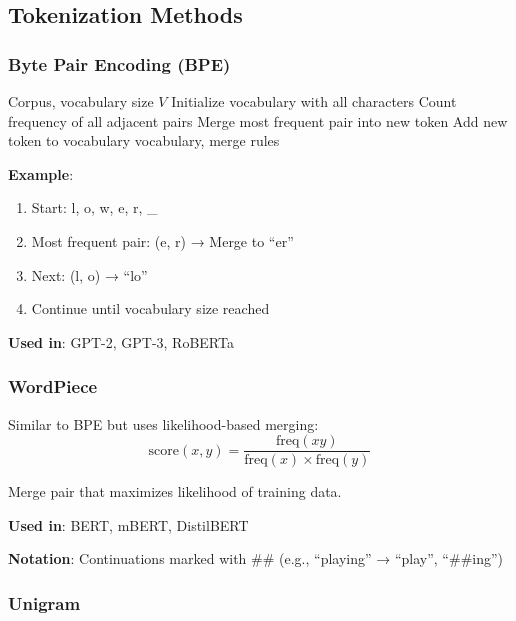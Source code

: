 \subsection{Tokenization Methods}

\subsubsection{Byte Pair Encoding (BPE)}

\begin{algorithm}[H]
\caption{BPE Training}
\begin{algorithmic}[1]
\REQUIRE Corpus, vocabulary size $V$
\STATE Initialize vocabulary with all characters
    \STATE Count frequency of all adjacent pairs
    \STATE Merge most frequent pair into new token
    \STATE Add new token to vocabulary
\ENDWHILE
\RETURN vocabulary, merge rules
\end{algorithmic}
\end{algorithm}

\textbf{Example}:
\begin{enumerate}
    \item Start: l, o, w, e, r, \_
    \item Most frequent pair: (e, r) → Merge to ``er''
    \item Next: (l, o) → ``lo''
    \item Continue until vocabulary size reached
\end{enumerate}

\textbf{Used in}: GPT-2, GPT-3, RoBERTa

\subsubsection{WordPiece}

Similar to BPE but uses likelihood-based merging:
\begin{equation}
\text{score}(x, y) = \frac{\text{freq}(xy)}{\text{freq}(x) \times \text{freq}(y)}
\end{equation}

Merge pair that maximizes likelihood of training data.

\textbf{Used in}: BERT, mBERT, DistilBERT

\textbf{Notation}: Continuations marked with \#\# (e.g., ``playing'' → ``play'', ``\#\#ing'')

\subsubsection{Unigram}

